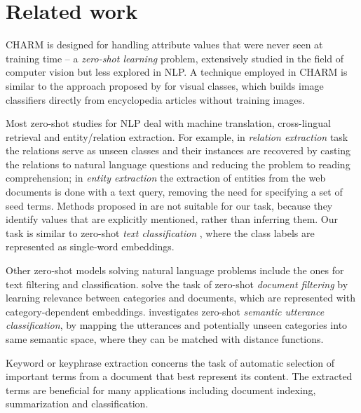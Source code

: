
\section{Related work}

CHARM 
is designed for handling attribute values
that were never seen at training time -- a \emph{zero-shot learning} problem, extensively studied in the field of computer vision but less explored in NLP. A technique employed in CHARM is similar to the approach proposed by \citet{zero-shot15} for visual classes, which
builds image classifiers directly from
encyclopedia articles  
without
training images.

Most zero-shot studies for NLP \cite{wang2019survey} deal with machine translation, cross-lingual retrieval and entity/relation extraction. For example, in \textit{relation extraction} task \cite{levy2017zero} the relations serve as unseen classes and their instances are recovered by casting the relations to natural language questions and reducing the problem to reading comprehension; in \textit{entity extraction} \cite{pasupat2014zero} the extraction of entities from the web documents is done with a text query, removing the need for specifying a set of seed terms. Methods proposed in \cite{levy2017zero, pasupat2014zero} are not suitable for our task, because they identify values that are explicitly mentioned, rather than inferring them. Our task is similar to zero-shot \textit{text classification} \cite{yazdani2015model, zhang2019integrating}, where the class labels are represented as single-word embeddings.

Other zero-shot models solving natural language problems include the ones for text filtering and classification. \citet{li2018deep} solve the task of zero-shot \textit{document filtering} by learning relevance between categories and documents, which are represented with category-dependent embeddings. \citet{dauphin2013zero} investigates zero-shot \textit{semantic utterance classification}, by mapping the utterances and potentially unseen categories into same semantic space, where they can be matched with distance functions.

Keyword or keyphrase extraction concerns the task of automatic selection of important terms from a document that best represent its content. The extracted terms are beneficial for many applications including document indexing, summarization and classification. 

